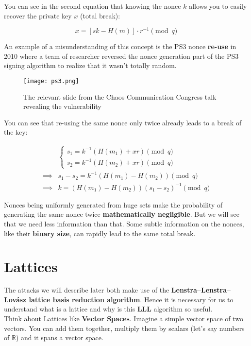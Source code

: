 \documentclass[a4paper,11pt]{article}
\begin{document}
You can see in the second equation that knowing the nonce $k$ allows you to easily recover the private key $x$ (total break):

$$
x = [ s k - H(m) ] \cdot r^{-1} \pmod{q}
$$

An example of a misunderstanding of this concept is the PS3 nonce \textbf{re-use} in 2010\cite{ps3} where a team of researcher reversed the nonce generation part of the PS3 signing algorithm to realize that it wasn't totally random.

\begin{figure}[H]
\texttt{[image: ps3.png]}
\caption{The relevant slide from the Chaos Communication Congress talk revealing the vulnerability}
\end{figure}

You can see that re-using the same nonce only twice already leads to a break of the key:

\begin{align*}
    &\begin{cases}
    s_1 = k^{-1} ( H(m_1) + x r ) \pmod{q}\\
    s_2 = k^{-1} ( H(m_2) + x r ) \pmod{q}
    \end{cases}\\
\implies& s_1 - s_2 = k^{-1} ( H(m_1) - H(m_2) ) \pmod{q}\\
\implies& k = (H(m_1) - H(m_2)) (s_1 - s_2)^{-1} \pmod{q}
\end{align*}

Nonces being uniformly generated from huge sets make the probability of generating the same nonce twice \textbf{mathematically negligible}. But we will see that we need less information than that. Some subtle information on the nonces, like their \textbf{binary size}, can rapidly lead to the same total break.

\section{Lattices}

The attacks we will describe later both make use of the \textbf{Lenstra–Lenstra–Lovász lattice basis reduction algorithm}. Hence it is necessary for us to understand what is a lattice and why is this \textbf{LLL} algorithm so useful.\\
Think about Lattices like \textbf{Vector Spaces}. Imagine a simple vector space of two vectors. You can add them together, multiply them by scalars (let's say numbers of $\mathbb{R}$) and it spans a vector space.\\
\end{document}
